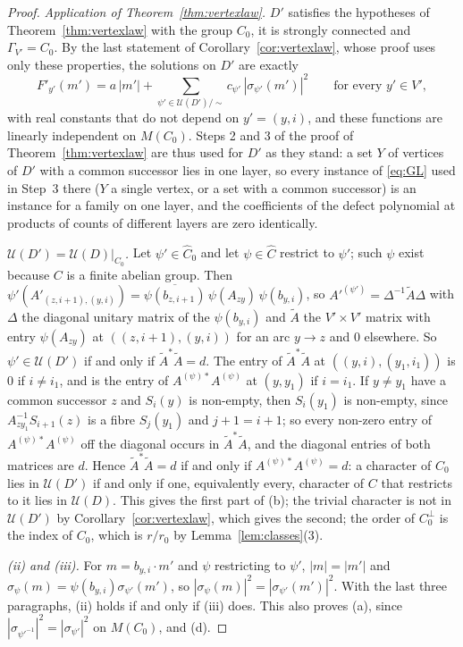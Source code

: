 \begin{proof}
\emph{Application of Theorem~\ref{thm:vertexlaw}.} $D'$ satisfies the hypotheses of Theorem~\ref{thm:vertexlaw} with the group $C_0$, it is strongly connected and $\Gamma_{V'}=C_0$. By the last statement of Corollary~\ref{cor:vertexlaw}, whose proof uses only these properties, the solutions on $D'$ are exactly
\[
F'_{y'}(m')=a\,|m'|+\sum_{\psi'\in\mathcal{U}(D')/\sim}c_{\psi'}\,|\sigma_{\psi'}(m')|^2\qquad\text{for every }y'\in V',
\]
with real constants that do not depend on $y'=(y,i)$, and these functions are linearly independent on $M(C_0)$. Steps 2 and 3 of the proof of Theorem~\ref{thm:vertexlaw} are thus used for $D'$ as they stand: a set $Y$ of vertices of $D'$ with a common successor lies in one layer, so every instance of \eqref{eq:GL} used in Step~3 there ($Y$ a single vertex, or a set with a common successor) is an instance for a family on one layer, and the coefficients of the defect polynomial at products of counts of different layers are zero identically.

\emph{$\mathcal{U}(D')=\mathcal{U}(D)|_{C_0}$.} Let $\psi'\in\hat C_0$ and let $\psi\in\hat C$ restrict to $\psi'$; such $\psi$ exist because $C$ is a finite abelian group. Then $\psi'(A'_{(z,i+1),(y,i)})=\overline{\psi(b_{z,i+1})}\,\psi(A_{zy})\,\psi(b_{y,i})$, so $A'^{(\psi')}=\Delta^{-1}\tilde A\Delta$ with $\Delta$ the diagonal unitary matrix of the $\psi(b_{y,i})$ and $\tilde A$ the $V'\times V'$ matrix with entry $\psi(A_{zy})$ at $((z,i+1),(y,i))$ for an arc $y\to z$ and $0$ elsewhere. So $\psi'\in\mathcal{U}(D')$ if and only if $\tilde A^*\tilde A=d$. The entry of $\tilde A^*\tilde A$ at $((y,i),(y_1,i_1))$ is $0$ if $i\ne i_1$, and is the entry of $A^{(\psi)*}A^{(\psi)}$ at $(y,y_1)$ if $i=i_1$. If $y\ne y_1$ have a common successor $z$ and $S_i(y)$ is non-empty, then $S_i(y_1)$ is non-empty, since $A_{zy_1}^{-1}S_{i+1}(z)$ is a fibre $S_j(y_1)$ and $j+1=i+1$; so every non-zero entry of $A^{(\psi)*}A^{(\psi)}$ off the diagonal occurs in $\tilde A^*\tilde A$, and the diagonal entries of both matrices are $d$. Hence $\tilde A^*\tilde A=d$ if and only if $A^{(\psi)*}A^{(\psi)}=d$: a character of $C_0$ lies in $\mathcal{U}(D')$ if and only if one, equivalently every, character of $C$ that restricts to it lies in $\mathcal{U}(D)$. This gives the first part of (b); the trivial character is not in $\mathcal{U}(D')$ by Corollary~\ref{cor:vertexlaw}, which gives the second; the order of $C_0^\perp$ is the index of $C_0$, which is $r/r_0$ by Lemma~\ref{lem:classes}(3).

\emph{(ii) and (iii).} For $m=b_{y,i}\cdot m'$ and $\psi$ restricting to $\psi'$, $|m|=|m'|$ and $\sigma_\psi(m)=\psi(b_{y,i})\sigma_{\psi'}(m')$, so $|\sigma_\psi(m)|^2=|\sigma_{\psi'}(m')|^2$. With the last three paragraphs, (ii) holds if and only if (iii) does. This also proves (a), since $|\sigma_{\psi'^{-1}}|^2=|\sigma_{\psi'}|^2$ on $M(C_0)$, and (d).


\end{proof}
